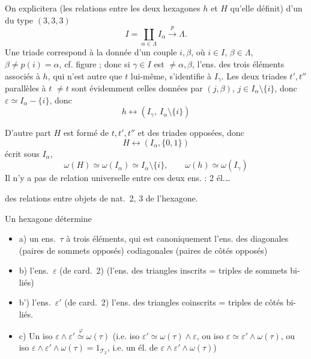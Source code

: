 \documentclass[11pt,a4paper]{article}
\begin{document}
On explicitera (les relations entre les deux hexagones $h$ et $H$ qu'elle définit)  d'un \ill{} du type $(3,3,3)$
\[
  I = \coprod_{\alpha \in \Lambda} I_\alpha \xrightarrow{\ p\ } \Lambda .
\]
Une triade correspond à la donnée d'un couple $i, \beta$, où $i \in I$, $\beta \in \Lambda$, $\beta \neq p(i) = \alpha$, cf. figure ; donc si $\gamma \in I$ est $\neq \alpha, \beta$,  l'ens. des trois éléments associés à $h$, qui n'est autre que $t$ lui-même, s'identifie à $I_\gamma$. Les deux triades $t', t''$ parallèles à $t$ \ill{} $\neq t$ sont évidemment celles données par $(j,\beta)$, $j \in I_\alpha \setminus \{i\}$, donc $\varepsilon \simeq I_\alpha - \{i\}$, donc
\[
  h \leftrightarrow (I_\gamma,\ I_\alpha \setminus \{i\})
\]


D'autre part $H$ est formé de $t, t', t''$ et des triades opposées, donc
\[
  H \leftrightarrow (I_\alpha, \{0,1\})
\]
 écrit sous $I_\alpha$,
\[
  \omega(H) \simeq \omega(I_\alpha) \simeq I_\alpha \setminus \{i\}, \qquad
  \omega(h) \simeq \omega(I_\gamma)
\]
Il n'y a pas de relation universelle entre ces deux ens. : 2 él.…

   des relations entre  objets de nat.\ 2, 3 de l'hexagone.

Un hexagone détermine
\begin{itemize}
  \item a) un ens.\ $\tau$ à trois éléments, qui est canoniquement l'ens. des diagonales (paires de sommets opposés)  codiagonales (paires de côtés opposés)
  \item b) l'ens.\ $\varepsilon$ (de card.\ 2) \struck{\ill{}} (l'ens. des triangles inscrits = triples de sommets bi-liés)
  \item b') l'ens.\ $\varepsilon'$ (de card.\ 2) l'ens. des triangles coinscrits = triples de côtés bi-liés.
  \item c) Un iso $\varepsilon \wedge \varepsilon' \overset{\varphi}{\simeq} \omega(\tau)$   (i.e. iso $\varepsilon' \simeq \omega(\tau) \wedge \varepsilon$, ou iso $\varepsilon \simeq \varepsilon' \wedge \omega(\tau)$, ou iso $\varepsilon \wedge \varepsilon' \wedge \omega(\tau) = 1_{\mathcal{T}_2}$, i.e. un él. de $\varepsilon \wedge \varepsilon' \wedge \omega(\tau)$)
\end{itemize}
\end{document}
